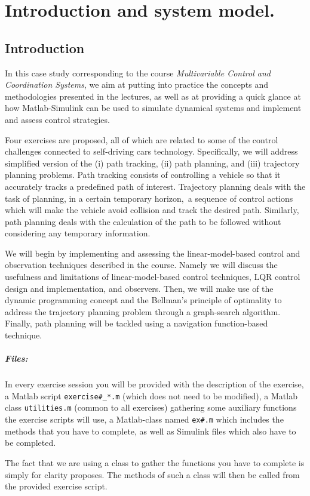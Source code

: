 \setcounter{chapter}{-1}
\chapter{Introduction and system model.}
%
\section{Introduction}
	In this case study corresponding to the course \emph{Multivariable Control and Coordination Systems}, we aim at putting into practice the concepts and methodologies presented in the lectures, as well as at providing a quick glance at how Matlab-Simulink can be used to simulate dynamical systems and implement and assess control strategies. \par
	Four exercises are proposed, all of which are related to some of the control challenges connected to self-driving cars technology.
	Specifically, we will address simplified version of the (i) path tracking, (ii) path planning, and (iii) trajectory planning problems. 
	Path tracking consists of controlling a vehicle so that it accurately tracks a predefined path of interest. 
	Trajectory planning deals with the task of planning, in a certain temporary horizon, a sequence of control actions which will make the vehicle avoid collision and track the desired path. 
	Similarly, path planning deals with the calculation of the path to be followed without considering any temporary information.
	\par
	We will begin by implementing and assessing the linear-model-based control and observation techniques described in the course.
	Namely we will discuss the usefulness and limitations of linear-model-based control techniques, LQR control design and implementation, and observers.
	Then, we will make use of the dynamic programming concept and the Bellman's principle of optimality to address the trajectory planning problem through a graph-search algorithm.
	Finally, path planning will be tackled using a navigation function-based technique.
	\paragraph{Files:}
	In every exercise session you will be provided with the description of the exercise, a Matlab script \texttt{exercise\#\_*.m} (which does not need to be modified), a Matlab class \texttt{utilities.m} (common to all exercises) gathering some auxiliary functions the exercise scripts will use, a Matlab-class named \texttt{ex\#.m} which includes the methods that you have to complete, as well as Simulink files which also have to be completed.\par
	The fact that we are using a class to gather the functions you have to complete is simply for clarity proposes. 
	The methods of such a class will then be called from the provided exercise script.\par
